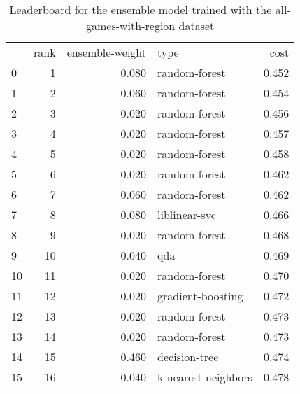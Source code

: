\begin{table}[]
	\centering
	\begin{tabular}{lrrlr}
		   & rank & ensemble-weight & type                & cost  \\
		0  & 1    & 0.080           & random-forest       & 0.452 \\
		1  & 2    & 0.060           & random-forest       & 0.454 \\
		2  & 3    & 0.020           & random-forest       & 0.456 \\
		3  & 4    & 0.020           & random-forest       & 0.457 \\
		4  & 5    & 0.020           & random-forest       & 0.458 \\
		5  & 6    & 0.020           & random-forest       & 0.462 \\
		6  & 7    & 0.060           & random-forest       & 0.462 \\
		7  & 8    & 0.080           & liblinear-svc       & 0.466 \\
		8  & 9    & 0.020           & random-forest       & 0.468 \\
		9  & 10   & 0.040           & qda                 & 0.469 \\
		10 & 11   & 0.020           & random-forest       & 0.470 \\
		11 & 12   & 0.020           & gradient-boosting   & 0.472 \\
		12 & 13   & 0.020           & random-forest       & 0.473 \\
		13 & 14   & 0.020           & random-forest       & 0.473 \\
		14 & 15   & 0.460           & decision-tree       & 0.474 \\
		15 & 16   & 0.040           & k-nearest-neighbors & 0.478 \\
	\end{tabular}

	\caption{Leaderboard for the ensemble model trained with the all-games-with-region dataset}
	\label{tab:lb-all-games-with-region-autoencode}
\end{table}


